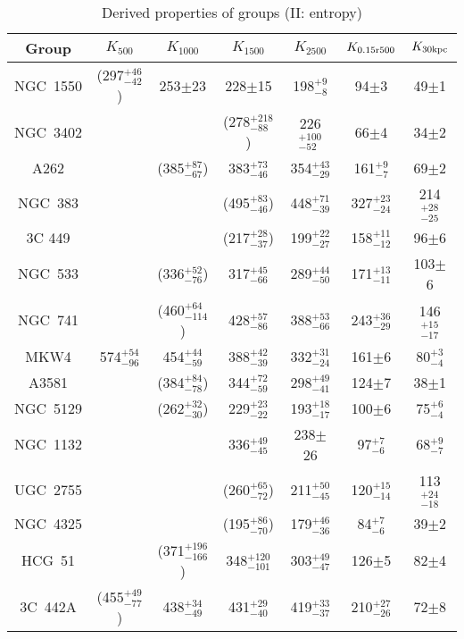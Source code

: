 \begin{table}
    \begin{center}
    \caption{Derived properties of groups (II: entropy)}
    {\scriptsize
    \begin{tabular}{ccccccc} \hline \hline
    Group & $K_{500}$\tablenotemark{a} & $K_{1000}$\tablenotemark{a} & $K_{1500}$\tablenotemark{a} & $K_{2500}$ & $K_{\rm 0.15 r500}$ & $K_{\rm 30 kpc}$ \\ \hline
    
    NGC~1550 & (297$^{+46}_{-42}$) & 253$\pm$23 & 228$\pm$15 & 198$^{+9}_{-8}$ & 94$\pm$3 & 49$\pm$1 \\
    NGC~3402 & & & (278$^{+218}_{-88}$) & 226$^{+100}_{-52}$ & 66$\pm$4 & 34$\pm$2 \\
    A262 & & (385$^{+87}_{-67}$) & 383$^{+73}_{-46}$ & 354$^{+43}_{-29}$ & 161$^{+9}_{-7}$ & 69$\pm$2 \\
    NGC~383 & & & (495$^{+83}_{-46}$) & 448$^{+71}_{-39}$ & 327$^{+23}_{-24}$ & 214$^{+28}_{-25}$ \\
    3C 449 & & & (217$^{+28}_{-37}$) & 199$^{+22}_{-27}$ & 158$^{+11}_{-12}$ & 96$\pm$6 \\
    NGC~533 & & (336$^{+52}_{-76}$) & 317$^{+45}_{-66}$ & 289$^{+44}_{-50}$ & 171$^{+13}_{-11}$ & 103$\pm$6 \\
    NGC~741 & & (460$^{+64}_{-114}$) & 428$^{+57}_{-86}$ & 388$^{+53}_{-66}$ & 243$^{+36}_{-29}$ & 146$^{+15}_{-17}$ \\
    MKW4 & 574$^{+54}_{-96}$ & 454$^{+44}_{-59}$ & 388$^{+42}_{-39}$ & 332$^{+31}_{-24}$ & 161$\pm$6 & 80$^{+3}_{-4}$ \\
    A3581 & & (384$^{+84}_{-78}$) & 344$^{+72}_{-59}$ & 298$^{+49}_{-41}$ & 124$\pm$7 & 38$\pm$1 \\
    NGC~5129 & & (262$^{+32}_{-30}$) & 229$^{+23}_{-22}$ & 193$^{+18}_{-17}$ & 100$\pm$6 & 75$^{+6}_{-4}$ \\
    NGC~1132 & & & 336$^{+49}_{-45}$ & 238$\pm$26 & 97$^{+7}_{-6}$ & 68$^{+9}_{-7}$ \\
    UGC~2755 & & & (260$^{+65}_{-72}$) & 211$^{+50}_{-45}$ & 120$^{+15}_{-14}$ & 113$^{+24}_{-18}$ \\
    NGC~4325 & & & (195$^{+86}_{-70}$) & 179$^{+46}_{-36}$ & 84$^{+7}_{-6}$ & 39$\pm$2 \\
    HCG~51 & & (371$^{+196}_{-166}$) & 348$^{+120}_{-101}$ & 303$^{+49}_{-47}$ & 126$\pm$5 & 82$\pm$4 \\
    3C~442A & (455$^{+49}_{-77}$) & 438$^{+34}_{-49}$ & 431$^{+29}_{-40}$ & 419$^{+33}_{-37}$ & 210$^{+27}_{-26}$ & 72$\pm$8 \\

\end{tabular}}
\end{center}
\end{table}
